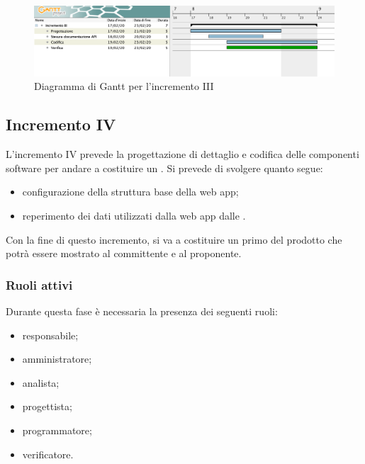 		\begin{landscape}
          \begin{figure}[H]
            \centering
            \includegraphics[width=\linewidth]{images/gantt/incrementoIII} %
            \caption{Diagramma di Gantt per l'incremento III}
          \end{figure}		
		\end{landscape}


		\subsection{Incremento IV}
			
			L'incremento IV prevede la progettazione di dettaglio e codifica delle componenti software per andare a costituire un . Si prevede di svolgere quanto segue:
			\begin{itemize}
				\item configurazione della struttura base della web app;
				\item reperimento dei dati utilizzati dalla web app dalle .
			\end{itemize}
			Con la fine di questo incremento, si va a costituire un primo  del prodotto che potrà essere mostrato al committente e al proponente.
			
			\subsubsection{Ruoli attivi}
			
				Durante questa fase è necessaria la presenza dei seguenti ruoli:
				\begin{itemize}
					\item responsabile;
					\item amministratore;
					\item analista;
					\item progettista;
					\item programmatore;
					\item verificatore.
				\end{itemize}
			
